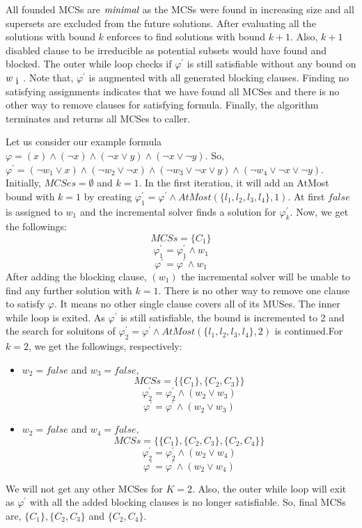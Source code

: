 All founded MCSs are $\emph{minimal}$ as the MCSs were found in increasing size and all supersets are excluded from the future solutions. After evaluating all the solutions with bound $k$ enforces to find solutions with bound $k+1$. Also, $k+1$ disabled clause to be irreducible as potential subsets would have found and blocked.\newline
The outer while loop checks if $\varphi^{\prime}$ is still satisfiable without any bound on $w_{\text i}$. Note that, $\varphi^{\prime}$ is augmented with all  generated blocking clauses. Finding no satisfying assignments indicates that we have found all MCSes and there is no other way to remove clauses for satisfying formula. Finally, the algorithm terminates and returns all MCSes to caller.
\begin{example}
Let us consider our example formula $\varphi=(x)\wedge(\neg x)\wedge(\neg x\vee y)\wedge(\neg x \vee \neg y)$. So, $\varphi^{\prime}=(\neg w_{1}\vee x)\wedge(\neg w_{2}\vee \neg x)\wedge(\neg w_{3}\vee \neg x\vee y)\wedge(\neg w_{4}\vee \neg x \vee \neg y)$. Initially, $MCSes=\emptyset$ and $k=1$.\newline
In the first iteration, it will add an AtMost bound with $k=1$ by creating $\varphi^{\prime}_{1}=\varphi^{\prime} \wedge AtMost(\{l_{1},l_{2},l_{3},l_{4}\},1)$. At first $false$ is assigned to $w_{1}$ and the incremental solver finds a solution for $\varphi^{\prime}_{k}$. Now, we get the followings:
$$MCSs=\{C_{1}\}$$
$$\varphi^{\prime}_{1}=\varphi^{\prime}_{1} \wedge w_{1}$$
$$\varphi^{\prime}=\varphi^{\prime} \wedge w_{1}$$
After adding the blocking clause, $(w_{1})$ the incremental solver will be unable to find any further solution with $k=1$. There is no other way to remove one clause to satisfy $\varphi$. It means no other single clause covers all of its MUSes. The inner while loop is exited.\newline
As $\varphi^{\prime}$ is still satisfiable, the bound is incremented to 2 and the search for soluitons of $\varphi^{\prime}_{2}=\varphi^{\prime} \wedge AtMost(\{l_{1},l_{2},l_{3},l_{4}\},2)$ is continued.For $k=2$, we get the followings, respectively:
\begin{itemize}
	\item $w_{2}=false$ and $w_{3}=false,$
	$$MCSs=\{\{C_{1}\}, \{C_{2}, C_{3}\}\}$$
	$$\varphi^{\prime}_{2}=\varphi^{\prime}_{2} \wedge (w_{2}\vee w_{3})$$
	$$\varphi^{\prime}=\varphi^{\prime} \wedge (w_{2}\vee w_{3})$$
	\item $w_{2}=false$ and $w_{4}=false,$
	$$MCSs=\{\{C_{1}\}, \{C_{2}, C_{3}\}, \{C_{2}, C_{4}\}\}$$
	$$\varphi^{\prime}_{2}=\varphi^{\prime}_{2} \wedge (w_{2}\vee w_{4})$$
	$$\varphi^{\prime}=\varphi^{\prime} \wedge (w_{2}\vee w_{4})$$
\end{itemize}
We will not get any other MCSes for $K=2$. Also, the outer while loop will exit as $\varphi^{\prime}$ with all the added blocking clauses is no longer satisfiable. So, final MCSs are, $\{C_{1}\}, \{C_{2}, C_{3}\}$ and $\{C_{2}, C_{4}\}$.
\end{example}

